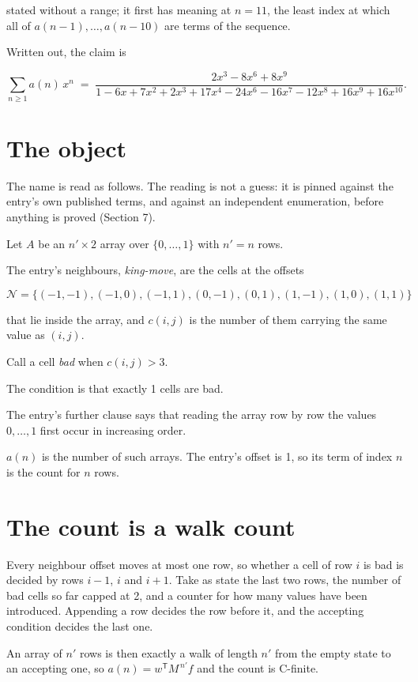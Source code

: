 \documentclass[11pt]{article}
\theoremstyle{definition}
\begin{document}
stated without a range; it first has meaning at $n = 11$, the least index at which all of $a(n-1),\dots,a(n-10)$ are terms of the sequence.

Written out, the claim is

\[\sum_{n \ge 1} a(n)\,x^n \;=\; \frac{2x^{3} - 8x^{6} + 8x^{9}}{1 - 6x + 7x^{2} + 2x^{3} + 17x^{4} - 24x^{6} - 16x^{7} - 12x^{8} + 16x^{9} + 16x^{10}}.\]

\section{The object}

The name is read as follows. The reading is not a guess: it is pinned against the entry's own published terms, and against an independent enumeration, before anything is proved (Section 7).

Let $A$ be an $n' \times 2$ array over $\{0,\dots,1\}$ with $n' = n$ rows.

The entry's neighbours, {\itshape king-move}, are the cells at the offsets

\[\mathcal{N} = \{(-1,-1), (-1,0), (-1,1), (0,-1), (0,1), (1,-1), (1,0), (1,1)\}\]

that lie inside the array, and $c(i,j)$ is the number of them carrying the same value as $(i,j)$.

Call a cell {\itshape bad} when $c(i,j) > 3$.

The condition is that exactly 1 cells are bad.

The entry's further clause says that reading the array row by row the values $0,\dots,1$ first occur in increasing order.

$a(n)$ is the number of such arrays. The entry's offset is 1, so its term of index $n$ is the count for $n$ rows.

\section{The count is a walk count}

Every neighbour offset moves at most one row, so whether a cell of row $i$ is bad is decided by rows $i-1$, $i$ and $i+1$. Take as state the last two rows, the number of bad cells so far capped at 2, and a counter for how many values have been introduced. Appending a row decides the row before it, and the accepting condition decides the last one.

An array of $n'$ rows is then exactly a walk of length $n'$ from the empty state to an accepting one, so $a(n) = w^{\mathsf T}M^{\,n'}f$ and the count is C-finite.
\end{document}
